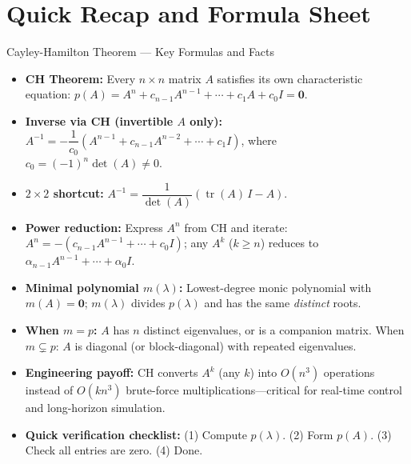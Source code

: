 \documentclass[12pt,a4paper]{article}
\begin{document}
\section{Quick Recap and Formula Sheet}

\begin{learnbox}{Cayley-Hamilton Theorem --- Key Formulas and Facts}
\begin{itemize}
  \item \textbf{CH Theorem:} Every $n\times n$ matrix $A$ satisfies its own characteristic equation:
        $p(A) = A^{n} + c_{n-1}A^{n-1} + \cdots + c_{1}A + c_{0}I = \mathbf{0}$.
  \item \textbf{Inverse via CH (invertible $A$ only):}
        $A^{-1} = -\dfrac{1}{c_{0}}\!\left(A^{n-1} + c_{n-1}A^{n-2} + \cdots + c_{1}I\right)$,
        where $c_{0} = (-1)^{n}\det(A) \neq 0$.
  \item \textbf{$2\times2$ shortcut:}
        $A^{-1} = \dfrac{1}{\det(A)}\!\left(\operatorname{tr}(A)\,I - A\right)$.
  \item \textbf{Power reduction:} Express $A^{n}$ from CH and iterate:
        $A^{n} = -(c_{n-1}A^{n-1}+\cdots+c_{0}I)$;
        any $A^{k}$ ($k\geq n$) reduces to $\alpha_{n-1}A^{n-1}+\cdots+\alpha_{0}I$.
  \item \textbf{Minimal polynomial $m(\lambda)$:} Lowest-degree monic polynomial with $m(A)=\mathbf{0}$;
        $m(\lambda)$ divides $p(\lambda)$ and has the same \emph{distinct} roots.
  \item \textbf{When $m=p$:} $A$ has $n$ distinct eigenvalues, or is a companion matrix.
        When $m \subsetneq p$: $A$ is diagonal (or block-diagonal) with repeated eigenvalues.
  \item \textbf{Engineering payoff:} CH converts $A^{k}$ (any $k$) into $O(n^{3})$ operations
        instead of $O(kn^{3})$ brute-force multiplications---critical for real-time control and
        long-horizon simulation.
  \item \textbf{Quick verification checklist:}
        (1) Compute $p(\lambda)$. (2) Form $p(A)$. (3) Check all entries are zero. (4) Done.
\end{itemize}
\end{learnbox}
\end{document}
